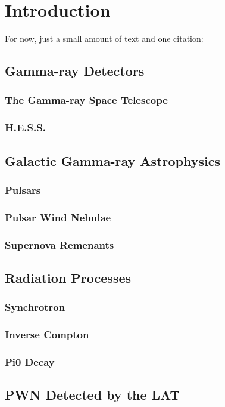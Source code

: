
\chapter{Introduction}
For now, just a small amount of text and one citation: \cite{second_lat_catalog_2012}

\section{Gamma-ray Detectors}
\subsection{The \fermi Gamma-ray Space Telescope}
\subsection{H.E.S.S.}

\section{Galactic Gamma-ray Astrophysics}
\subsection{Pulsars}
\subsection{Pulsar Wind Nebulae}
\subsection{Supernova Remenants}

\section{Radiation Processes}
\subsection{Synchrotron}
\subsection{Inverse Compton}
\subsection{Pi0 Decay}

\section{PWN Detected by the LAT}
